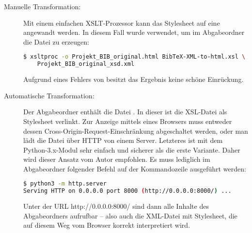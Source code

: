 \begin{description}
    \item[Manuelle Transformation:] Mit einem einfachen XSLT-Prozessor kann das
        Stylesheet auf eine \BibTeXXMLdatabase{} angewandt werden. In diesem
        Fall wurde  verwendet, um im Abgabeordner die Datei
        \fhtmlresult{} zu erzeugen:
\begin{lstlisting}[language=bash]
$ xsltproc -o Projekt_BIB_original.html BibTeX-XML-to-html.xsl \
    Projekt_BIB_original_xsd.xml
\end{lstlisting}
        Aufgrund eines Fehlers von  besitzt das Ergebnis keine
        schöne Einrückung.
    \item[Automatische Transformation:] Der Abgabeordner enthält die Datei
        \fxmlresultwithstylesheet. In dieser ist die XSL-Datei als Stylesheet
        verlinkt. Zur Anzeige mittels eines Browsers muss entweder dessen
        Cross-Origin-Request-Einschränkung abgeschaltet werden, oder man lädt
        die Datei über HTTP von einem Server. Letzteres ist mit dem
        Python-3.x-Modul \file{http.server} sehr einfach und sicherer als die
        erste Variante. Daher wird dieser Ansatz vom Autor empfohlen. Es muss
        lediglich im Abgabeordner folgender Befehl auf der Kommandozeile
        ausgeführt werden:
\begin{lstlisting}[language=bash]
$ python3 -m http.server
Serving HTTP on 0.0.0.0 port 8000 (http://0.0.0.0:8000/) ...
\end{lstlisting}
        Unter der URL {\ttfamily http://0.0.0.0:8000/} sind dann alle Inhalte
        des Abgabeordners aufrufbar -- also auch die XML-Datei mit Stylesheet,
        die auf diesem Weg vom Browser korrekt interpretiert wird.
\end{description}